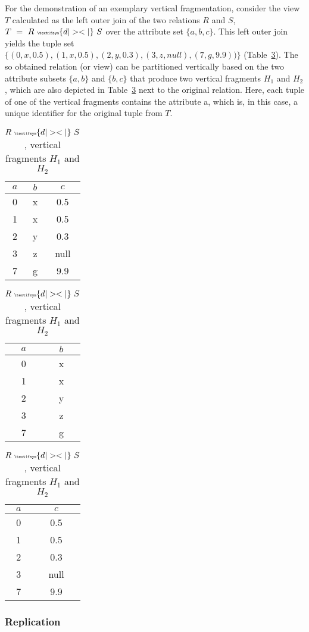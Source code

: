 \begin{exmp}
For the demonstration of an exemplary vertical fragmentation, consider the view $T$ calculated as the left outer join of the two relations $R$ and $S$, 
$T~=~R~{\tiny \textifsym{d|><|}}~S$ over the attribute set $\{a,b,c\}$. 
This left outer join yields the tuple set $\{(0,x,0.5), (1,x,0.5), (2,y,0.3), (3,z,null), (7,g,9.9))\}$ (Table~\ref{tab:join_vert_frag}). The so obtained
relation (or view) can be partitioned vertically based on the two attribute subsets $\{a,b\}$ and $\{b,c\}$ that produce two vertical fragments $H_1$ and 
$H_2$, which are also depicted in Table~\ref{tab:join_vert_frag} next to the original relation. Here, each tuple of one of the vertical fragments contains the
attribute a, which is, in this case, a unique identifier for the original tuple from $T$.

\begin{table}[h]
    \centering
    \begin{tabular}{c|c|c}
        $a$ & $b$ & $c$ \\
        \hline
        0 & x & 0.5 \\
        1 & x & 0.5 \\
        2 & y & 0.3 \\
        3 & z & null \\
        7 & g & 9.9 \\
    \end{tabular}
    \hspace{20pt}
    \begin{tabular}{c|c}
        $a$ & $b$ \\
        \hline
        0 & x \\
        1 & x \\
        2 & y \\
        3 & z \\
        7 & g \\
    \end{tabular}
    \hspace{5pt}
    \begin{tabular}{c|c}
        $a$ & $c$ \\
        \hline
        0 & 0.5 \\
        1 & 0.5 \\
        2 & 0.3 \\
        3 & null \\
        7 & 9.9 \\
    \end{tabular}
    \caption{$R~{\tiny \textifsym{d|><|}}~S$, vertical fragments $H_1$ and $H_2$}
    \label{tab:join_vert_frag}
\end{table}

\end{exmp}



\subsubsection{Replication}
\label{sec:theo_ddb_repl}
